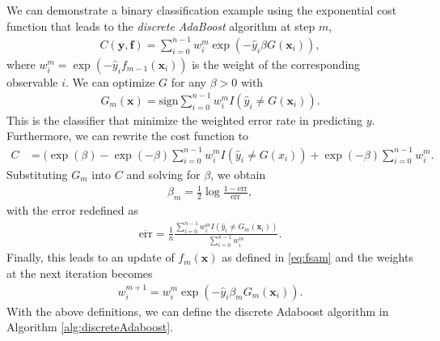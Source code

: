 We can demonstrate a binary classification example using the exponential cost function that leads to the \textit{discrete AdaBoost} algorithm \cite{Friedman2000} at step $m$,
\begin{align}
  C(\boldsymbol{y},\boldsymbol{f}) = \sum_{i=0}^{n-1} w_i^m \exp(-\hat{y}_i\beta G(\boldsymbol{x}_i)),
\end{align}
where $w_i^m = \exp(-\hat{y}_if_{m-1}(\boldsymbol{x}_i))$ is the weight of the corresponding observable $i$.
We can optimize $G$ for any $\beta>0$ with
\begin{align}
  G_m(\boldsymbol{x}) = \text{sign} \sum_{i=0}^{n-1} w_i^m I(\hat{y}_i \neq G(\boldsymbol{x}_i)).
\end{align}
This is the classifier that minimize the weighted error rate in predicting $y$. Furthermore, we can rewrite the cost function to
\begin{align}
    C &= (\exp(\beta)-\exp(-\beta)\sum_{i=0}^{n-1} w_i^m I(\hat{y}_i \neq G(x_i)) + \exp(-\beta)\sum_{i=0}^{n-1}w_i^m.
    \label{eq:exponentialcost}
\end{align}
Substituting $G_m$ into $C$ and solving for $\beta$, we obtain
\begin{align}
  \beta_m = \frac{1}{2} \log \frac{1 - \overline{\text{err}}}{\overline{\text{err}}},
\end{align}
with the error redefined as
\begin{align}
  \overline{\text{err}} = \frac{1}{n} \frac{ \sum_{i=0}^{n-1} w_i^m I(\hat{y}_i \neq G_m(\boldsymbol{x}_i)) }{\sum_{i=0}^{n-1} w_i^m}.
\end{align}
Finally, this leads to an update of $f_m(\boldsymbol{x})$ as defined in \autoref{eq:fsam} and the weights at the next iteration becomes
\begin{align}
  w_i^{m+1} = w_i^m \exp (-\hat{y}_i \beta_m G_m(\boldsymbol{x}_i)).
\end{align}
With the above definitions, we can define the discrete Adaboost algorithm in Algorithm \ref{alg:discreteAdaboost}.

